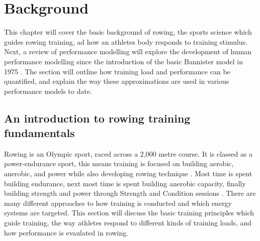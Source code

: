 \chapter{Background}
\label{Chapt2}
This chapter will cover the basic background of rowing, the sports science which guides rowing training, ad how an athletes body responds to training stimulus. Next, a review of performance modelling will explore the development of human performance modelling since the introduction of the basic Bannister model in 1975 \autocite{Bannister1976}. The section will outline how training load and performance can be quantified, and explain the way these approximations are used in various performance models to date.

\section{An introduction to rowing training fundamentals}
Rowing is an Olympic sport, raced across a 2,000 metre course. It is classed as a power-endurance sport, this means training is focused on building aerobic, anerobic, and power while also developing rowing technique \autocite{Mäestu2005}. Most time is spent building endurance, next most time is spent building anerobic capacity, finally building strength and power through Strength and Condition sessions \autocite{Seiler2006}. There are many different approaches to how training is conducted and which energy systems are targeted. This section will discuss the basic training principles which guide training, the way athletes respond to different kinds of training loads, and how performance is evaulated in rowing. 

